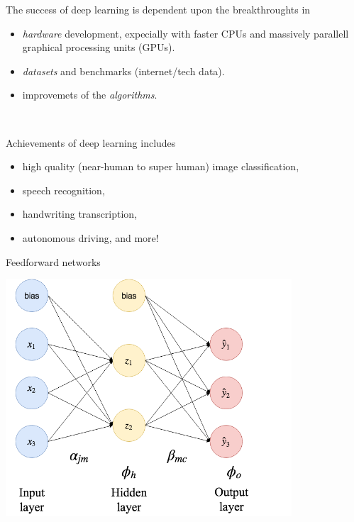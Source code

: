 \documentclass[
  10pt,
  ignorenonframetext,
]{beamer}
\providecommand{\tightlist}{%
  \setlength{\itemsep}{0pt}\setlength{\parskip}{0pt}}
\begin{document}
\begin{frame}
The success of deep learning is dependent upon the breakthroughts in

\begin{itemize}
\tightlist
\item
  \emph{hardware} development, expecially with faster CPUs and massively
  parallell graphical processing units (GPUs).
\item
  \emph{datasets} and benchmarks (internet/tech data).
\item
  improvemets of the \emph{algorithms}.
\end{itemize}

\(~\)

Achievements of deep learning includes

\begin{itemize}
\tightlist
\item
  high quality (near-human to super human) image classification,
\item
  speech recognition,
\item
  handwriting transcription,
\item
  autonomous driving, and more!
\end{itemize}
\end{frame}

\begin{frame}{Feedforward networks}
\protect\hypertarget{feedforward-networks}{}
\centering

\includegraphics[width=0.8\textwidth,height=\textheight]{drawNNp3h2o3.png}
\end{frame}
\end{document}
